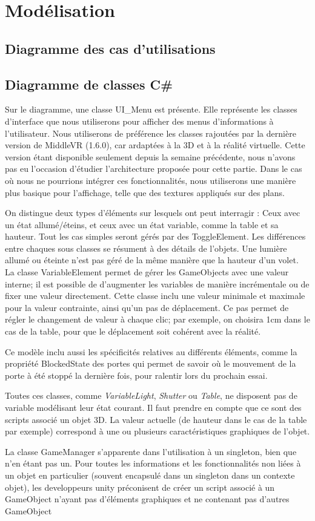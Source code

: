 \section{Modélisation}

\subsection{Diagramme des cas d’utilisations}


\subsection{Diagramme de classes C\#}

Sur le diagramme, une classe UI_Menu est présente. Elle représente les classes d'interface que nous utiliserons pour afficher des menus d'informations à l'utilisateur.
Nous utiliserons de préférence les classes rajoutées par la dernière version de MiddleVR (1.6.0), car ardaptées à la 3D et à la réalité virtuelle.
Cette version étant disponible seulement depuis la semaine précédente, nous n'avons pas eu l'occasion d'étudier l'architecture proposée pour cette partie.
Dans le cas où nous ne pourrions intégrer ces fonctionnalités, nous utiliserons une manière plus basique pour l'affichage, telle que des textures appliqués sur des plans.
 
On distingue deux types d'éléments sur lesquels ont peut interragir : Ceux avec un état allumé/éteins, et ceux avec un état variable, comme la table et sa hauteur.
Tout les cas simples seront gérés par des ToggleElement. Les différences entre chaques sous classes se résument à des détails de l'objets.
Une lumière allumé ou éteinte n'est pas géré de la même manière que la hauteur d'un volet.
La classe VariableElement permet de gérer les GameObjects avec une valeur interne; il est possible de d'augmenter les variables de manière incrémentale ou de fixer une valeur directement.
Cette classe inclu une valeur minimale et maximale pour la valeur contrainte, ainsi qu'un pas de déplacement.
Ce pas permet de régler le changement de valeur à chaque clic; par exemple, on choisira 1cm dans le cas de la table, pour que le déplacement soit cohérent avec la réalité.

Ce modèle inclu aussi les spécificités relatives au différents éléments, comme la propriété BlockedState des portes qui permet de savoir où le mouvement de la porte à été stoppé la dernière fois, pour ralentir lors du prochain essai.

Toutes ces classes, comme \textit{VariableLight}, \textit{Shutter} ou \textit{Table},  ne disposent pas de variable modélisant leur état courant. 
Il faut prendre en compte que ce sont des scripts associé un objet 3D. 
La valeur actuelle (de hauteur dans le cas de la table par exemple) correspond à une ou plusieurs caractéristiques graphiques de l'objet.

La classe GameManager s'apparente dans l'utilisation à un singleton, bien que n'en étant pas un. 
Pour toutes les informations et les fonctionnalités non liées à un objet en particulier (souvent encapsulé dans un singleton dans un contexte objet), les developpeurs unity préconisent de créer un script associé à un GameObject n'ayant pas d'éléments graphiques et ne contenant pas d'autres GameObject
